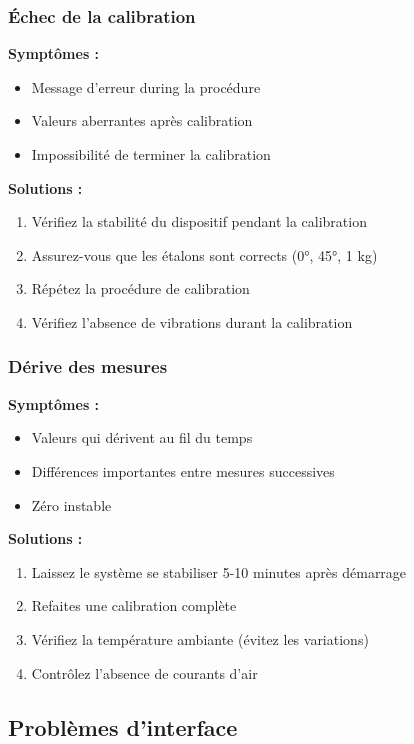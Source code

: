 \documentclass[12pt,a4paper]{article}
\begin{document}
\subsubsection{Échec de la calibration}

\textbf{Symptômes :}
\begin{itemize}
    \item Message d'erreur during la procédure
    \item Valeurs aberrantes après calibration
    \item Impossibilité de terminer la calibration
\end{itemize}

\textbf{Solutions :}
\begin{enumerate}
    \item Vérifiez la stabilité du dispositif pendant la calibration
    \item Assurez-vous que les étalons sont corrects (0°, 45°, 1 kg)
    \item Répétez la procédure de calibration
    \item Vérifiez l'absence de vibrations durant la calibration
\end{enumerate}

\subsubsection{Dérive des mesures}

\textbf{Symptômes :}
\begin{itemize}
    \item Valeurs qui dérivent au fil du temps
    \item Différences importantes entre mesures successives
    \item Zéro instable
\end{itemize}

\textbf{Solutions :}
\begin{enumerate}
    \item Laissez le système se stabiliser 5-10 minutes après démarrage
    \item Refaites une calibration complète
    \item Vérifiez la température ambiante (évitez les variations)
    \item Contrôlez l'absence de courants d'air
\end{enumerate}

\subsection{Problèmes d'interface}
\end{document}
